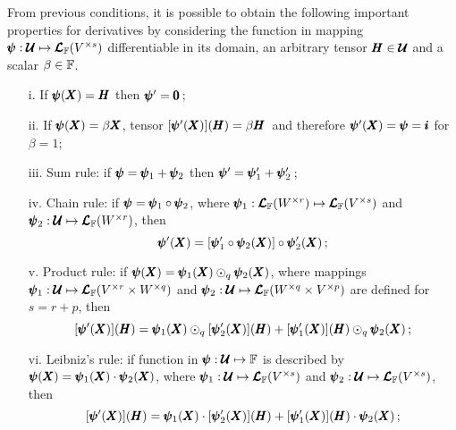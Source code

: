 From previous conditions, it is possible to obtain the following important properties for derivatives by considering the function in mapping $\pmb{\psi} : \pmb{\mathcal{U}} \mapsto \pmb{\mathcal{L}}_{\mathbb{F}}(V^{\times s})$ differentiable in its domain, an arbitrary tensor $\pmb{H}\in\pmb{\mathcal{U}}$ and a scalar $\beta\in\mathbb{F}$.
\begin{itemize}
	\setlength\itemsep{.1em}
	\item[i.] If $\pmb{\psi}(\pmb{X})=\pmb{H}$ then $\pmb{\psi}'=\pmb{0}\,$;
	\item[ii.] If $\pmb{\psi}(\pmb{X})=\beta\pmb{X}$, tensor $[\pmb{\psi}'(\pmb{X})](\pmb{H})=\beta\pmb{H}\,$ and therefore $\pmb{\psi}'(\pmb{X})=\pmb{\psi}=\pmb{i}$ for $\beta=1$;
	\item[iii.] Sum rule: if $\pmb{\psi}=\pmb{\psi}_1+\pmb{\psi}_2$ then $\pmb{\psi}'=\pmb{\psi}_1'+\pmb{\psi}_2'\,$;
	\item[iv.] Chain rule: if $\pmb{\psi}=\pmb{\psi}_1\circ\pmb{\psi}_2$, where $\pmb{\psi}_1 : \pmb{\mathcal{L}}_{\mathbb{F}}(W^{\times r}) \mapsto \pmb{\mathcal{L}}_{\mathbb{F}}(V^{\times s})$ and $\pmb{\psi}_2 : \pmb{\mathcal{U}} \mapsto \pmb{\mathcal{L}}_{\mathbb{F}}(W^{\times r})$, then
	\begin{equation}
		\pmb{\psi}'(\pmb{X})=[\pmb{\psi}_1'\circ\pmb{\psi}_2(\pmb{X})]\circ\pmb{\psi}_2'(\pmb{X})\,;
	\end{equation}
    \item[v.] Product rule: if $\pmb{\psi}(\pmb{X})=\pmb{\psi}_1(\pmb{X})\odot_q\pmb{\psi}_2(\pmb{X})$, where mappings  $\pmb{\psi}_1 : \pmb{\mathcal{U}} \mapsto \pmb{\mathcal{L}}_{\mathbb{F}}(V^{\times r}\times W^{\times q})$ and $\pmb{\psi}_2 : \pmb{\mathcal{U}} \mapsto \pmb{\mathcal{L}}_{\mathbb{F}}(W^{\times q}\times V^{\times p})$ are defined for $s=r+p$, then
	\begin{equation}
		[\pmb{\psi}'(\pmb{X})](\pmb{H})=\pmb{\psi}_1(\pmb{X})\odot_{q}[\pmb{\psi}_2'(\pmb{X})](\pmb{H}) + [\pmb{\psi}_1'(\pmb{X})](\pmb{H}) \odot_{q} \pmb{\psi}_2(\pmb{X})\,;
	\end{equation}
	\item[vi.] Leibniz's rule: if function in $\pmb{\psi} : \pmb{\mathcal{U}} \mapsto \mathbb{F}$ is described by $\pmb{\psi}(\pmb{X})=\pmb{\psi}_1(\pmb{X})\cdot\pmb{\psi}_2(\pmb{X})$, where $\pmb{\psi}_1 : \pmb{\mathcal{U}} \mapsto \pmb{\mathcal{L}}_{\mathbb{F}}(V^{\times s})$ and $\pmb{\psi}_2 : \pmb{\mathcal{U}} \mapsto \pmb{\mathcal{L}}_{\mathbb{F}}(V^{\times s})$, then
	\begin{equation}
	\fua{[\fua{\tnr{\psi}'}{\tnr{X}}]}{\tnr{H}}=\fua{\tnr{\psi}_1}{\tnr{X}}\cdot\fua{[\fua{\tnr{\psi}_2'}{\tnr{X}}]}{\tnr{H}} + \fua{[\fua{\tnr{\psi}_1'}{\tnr{X}}]}{\tnr{H}} \cdot \fua{\tnr{\psi}_2}{\tnr{X}}\,;

\end{equation}
\end{itemize}
